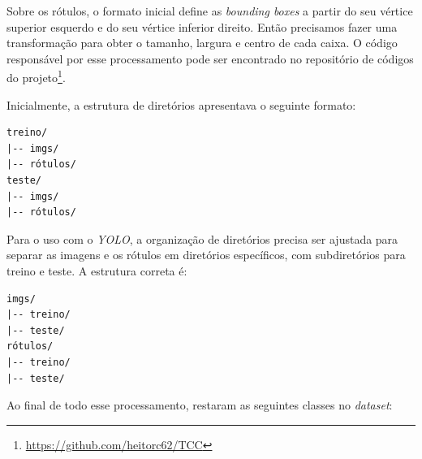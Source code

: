 Sobre os rótulos, o formato inicial define as \emph{bounding boxes} a partir do seu vértice superior esquerdo e do seu vértice inferior direito. Então precisamos fazer uma transformação para obter o tamanho, largura e centro de cada caixa. O código responsável por esse processamento pode ser encontrado no repositório de códigos do projeto\footnote{\url{https://github.com/heitorc62/TCC}}.

Inicialmente, a estrutura de diretórios apresentava o seguinte formato:
\begin{verbatim}
treino/
|-- imgs/
|-- rótulos/
teste/
|-- imgs/
|-- rótulos/
\end{verbatim}
Para o uso com o \emph{YOLO}, a organização de diretórios precisa ser ajustada para separar as imagens e os rótulos em diretórios específicos, com subdiretórios para treino e teste. A estrutura correta é:
\begin{verbatim}
imgs/
|-- treino/
|-- teste/
rótulos/
|-- treino/
|-- teste/
\end{verbatim}
Ao final de todo esse processamento, restaram as seguintes classes no \emph{dataset}:

\begin{table}[h!]
\centering
{}
\caption{Nomes originais das classes e suas traduções em português.}
\label{tab:class-names}
\end{table}


